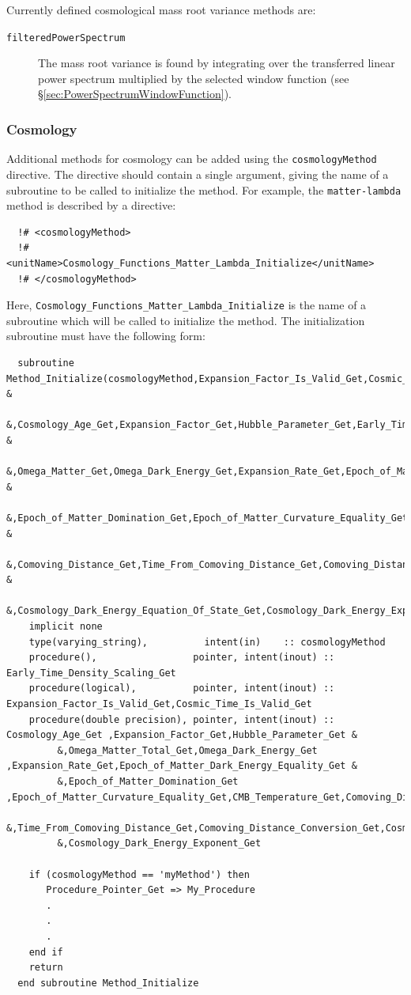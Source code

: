 Currently defined cosmological mass root variance methods are:
\begin{description}
 \item [{\tt filteredPowerSpectrum}] The mass root variance is found by integrating over the transferred linear power spectrum multiplied by the selected window function (see \S\ref{sec:PowerSpectrumWindowFunction}).
\end{description}

\subsubsection{Cosmology}\label{sec:CosmologyMethods}

Additional methods for cosmology can be added using the {\tt cosmologyMethod} directive. The directive should contain a single argument, giving the name of a subroutine to be called to initialize the method. For example, the {\tt matter-lambda} method is described by a directive:
\begin{verbatim}
  !# <cosmologyMethod>
  !#  <unitName>Cosmology_Functions_Matter_Lambda_Initialize</unitName>
  !# </cosmologyMethod>
\end{verbatim}
Here, {\tt Cosmology\_Functions\_Matter\_Lambda\_Initialize} is the name of a subroutine which will be called to initialize the method. The initialization subroutine must have the following form:
\begin{verbatim}
  subroutine Method_Initialize(cosmologyMethod,Expansion_Factor_Is_Valid_Get,Cosmic_Time_Is_Valid_Get &
       &,Cosmology_Age_Get,Expansion_Factor_Get,Hubble_Parameter_Get,Early_Time_Density_Scaling_Get  & 
       &,Omega_Matter_Get,Omega_Dark_Energy_Get,Expansion_Rate_Get,Epoch_of_Matter_Dark_Energy_Equality_Get &
       &,Epoch_of_Matter_Domination_Get,Epoch_of_Matter_Curvature_Equality_Get,CMB_Temperature_Get &
       &,Comoving_Distance_Get,Time_From_Comoving_Distance_Get,Comoving_Distance_Conversion & 
       &,Cosmology_Dark_Energy_Equation_Of_State_Get,Cosmology_Dark_Energy_Exponent_Get)
    implicit none
    type(varying_string),          intent(in)    :: cosmologyMethod
    procedure(),                 pointer, intent(inout) :: Early_Time_Density_Scaling_Get
    procedure(logical),          pointer, intent(inout) :: Expansion_Factor_Is_Valid_Get,Cosmic_Time_Is_Valid_Get
    procedure(double precision), pointer, intent(inout) :: Cosmology_Age_Get ,Expansion_Factor_Get,Hubble_Parameter_Get &
         &,Omega_Matter_Total_Get,Omega_Dark_Energy_Get ,Expansion_Rate_Get,Epoch_of_Matter_Dark_Energy_Equality_Get &
         &,Epoch_of_Matter_Domination_Get ,Epoch_of_Matter_Curvature_Equality_Get,CMB_Temperature_Get,Comoving_Distance_Get&
         &,Time_From_Comoving_Distance_Get,Comoving_Distance_Conversion_Get,Cosmology_Dark_Energy_Equation_Of_State_Get&
         &,Cosmology_Dark_Energy_Exponent_Get

    if (cosmologyMethod == 'myMethod') then
       Procedure_Pointer_Get => My_Procedure
       .
       .
       .
    end if
    return
  end subroutine Method_Initialize
\end{verbatim}
